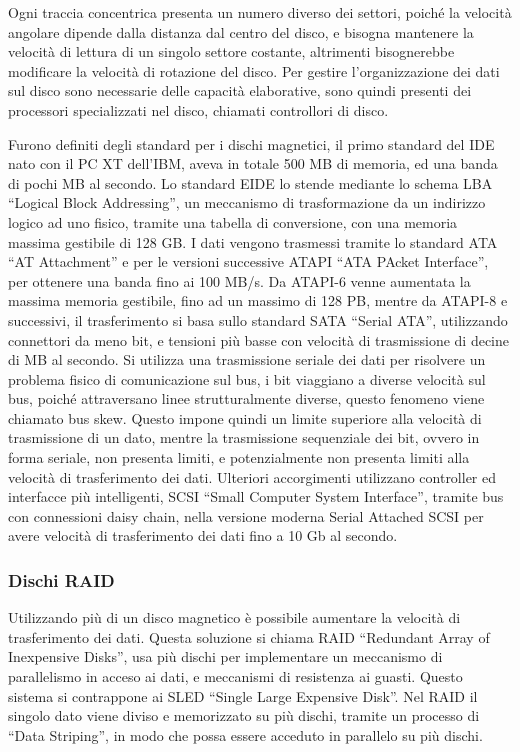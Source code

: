\documentclass{article}
\numberwithin{equation}{subsection}
\begin{document}
Ogni traccia concentrica presenta un numero diverso dei settori, poiché la velocità angolare dipende dalla distanza dal centro del disco, e bisogna mantenere la velocità di lettura di un singolo settore costante, 
altrimenti bisognerebbe modificare la velocità di rotazione del disco. Per gestire l'organizzazione dei dati sul disco sono necessarie delle capacità elaborative, sono quindi presenti dei processori 
specializzati nel disco, chiamati controllori di disco. 

Furono definiti degli standard per i dischi magnetici, il primo standard del IDE nato con il PC XT dell'IBM, aveva in totale 500 MB di memoria, ed una banda di pochi MB al secondo. 
Lo standard EIDE lo stende mediante lo schema LBA ``Logical Block Addressing'', un meccanismo di trasformazione da un indirizzo logico ad uno fisico, tramite una tabella di conversione, con una memoria massima 
gestibile di 128 GB. I dati vengono trasmessi tramite lo standard ATA ``AT Attachment'' e per le versioni successive ATAPI ``ATA PAcket Interface'', per ottenere una banda fino ai 100 MB/s. Da ATAPI-6 venne 
aumentata la massima memoria gestibile, fino ad un massimo di 128 PB, mentre da ATAPI-8 e successivi, il trasferimento si basa sullo standard SATA ``Serial ATA'', utilizzando connettori da meno bit, e tensioni 
più basse con velocità di trasmissione di decine di MB al secondo. Si utilizza una trasmissione seriale dei dati per risolvere un problema fisico di comunicazione sul bus, i bit viaggiano a diverse velocità 
sul bus, poiché attraversano linee strutturalmente diverse, questo fenomeno viene chiamato bus skew. Questo impone quindi un limite superiore alla velocità di trasmissione di un dato, mentre la trasmissione 
sequenziale dei bit, ovvero in forma seriale, non presenta limiti, e potenzialmente non presenta limiti alla velocità di trasferimento dei dati. 
Ulteriori accorgimenti utilizzano controller ed interfacce più intelligenti, SCSI ``Small Computer System Interface'', tramite bus con connessioni daisy chain, nella versione moderna Serial Attached SCSI per avere velocità di trasferimento dei 
dati fino a 10 Gb al secondo. 

\subsubsection{Dischi RAID}

Utilizzando più di un disco magnetico è possibile aumentare la velocità di trasferimento dei dati. Questa soluzione si chiama RAID ``Redundant Array of Inexpensive Disks'', usa più dischi per implementare un 
meccanismo di parallelismo in acceso ai dati, e meccanismi di resistenza ai guasti. Questo sistema si contrappone ai SLED ``Single Large Expensive Disk''. 
Nel RAID il singolo dato viene diviso e memorizzato su più dischi, tramite un processo di ``Data Striping'', in modo che possa essere acceduto in parallelo su più dischi. 
\end{document}

